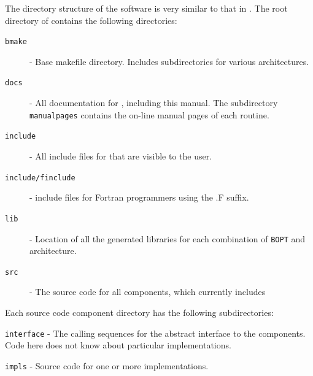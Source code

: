	The directory structure of the \slepc software is very similar to that in \petsc. The root directory of \slepc contains the following directories:
\begin{description}
\item[\texttt{bmake}] - Base \slepc makefile directory. Includes subdirectories for various architectures.
\item[\texttt{docs}] - All documentation for \slepc, including this manual. The subdirectory \texttt{manualpages} contains the on-line manual pages of each \slepc routine.
\item[\texttt{include}] - All include files for \slepc that are visible to the user.
\item[\texttt{include/finclude}] - \slepc include files for Fortran programmers using the .F suffix.
\item[\texttt{lib}] - Location of all the generated libraries for each combination of \texttt{BOPT} and architecture.
\item[\texttt{src}] - The source code for all \slepc components, which currently includes
\end{description}

Each \slepc source code component directory has the following subdirectories:
\begin{description}
\item \texttt{interface} - The calling sequences for the abstract interface to the components. Code here does not know about particular implementations.
\item \texttt{impls} - Source code for one or more implementations.
\end{description}

